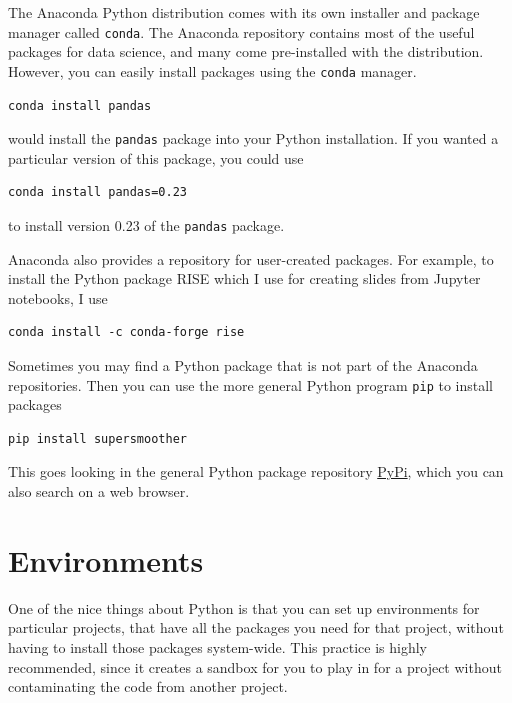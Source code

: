 \documentclass[
  letterpaper,
]{scrbook}
\begin{document}
The Anaconda Python distribution comes with its own installer and package manager called \texttt{conda}. The Anaconda repository contains most of the useful packages for data science, and many come pre-installed with the distribution. However, you can easily install packages using the \texttt{conda} manager.

\begin{verbatim}
conda install pandas
\end{verbatim}

would install the \texttt{pandas} package into your Python installation. If you wanted a particular version of this package, you could use

\begin{verbatim}
conda install pandas=0.23
\end{verbatim}

to install version 0.23 of the \texttt{pandas} package.

Anaconda also provides a repository for user-created packages. For example, to install the Python package RISE which I use for creating slides from Jupyter notebooks, I use

\begin{verbatim}
conda install -c conda-forge rise
\end{verbatim}

Sometimes you may find a Python package that is not part of the Anaconda repositories. Then you can use the more general Python program \texttt{pip} to install packages

\begin{verbatim}
pip install supersmoother
\end{verbatim}

This goes looking in the general Python package repository \href{https://pypi.org}{PyPi}, which you can also search on a web browser.

\hypertarget{environments}{%
\section{Environments}\label{environments}}

One of the nice things about Python is that you can set up environments for particular projects, that have all the packages you need for that project, without having to install those packages system-wide. This practice is highly recommended, since it creates a sandbox for you to play in for a project without contaminating the code from another project.
\end{document}
